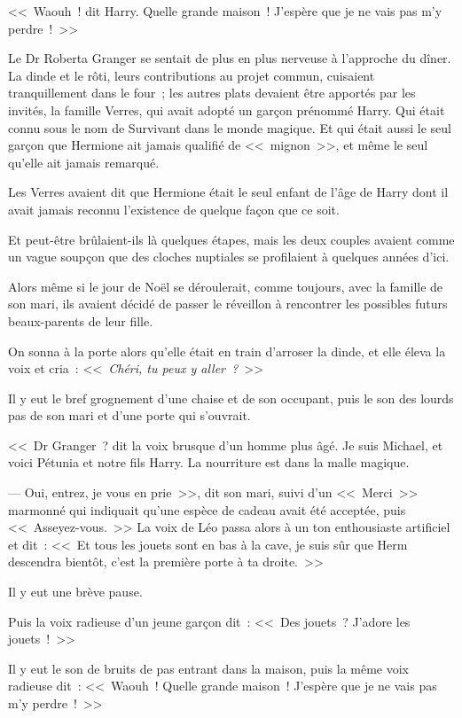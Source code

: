 <<~Waouh~! dit Harry. Quelle grande maison~! J'espère que je ne vais pas m'y perdre~!~>>

\later

Le Dr Roberta Granger se sentait de plus en plus nerveuse à l'approche du dîner. La dinde et le rôti, leurs contributions au projet commun, cuisaient tranquillement dans le four~; les autres plats devaient être apportés par les invités, la famille Verres, qui avait adopté un garçon prénommé Harry. Qui était connu sous le nom de Survivant dans le monde magique. Et qui était aussi le seul garçon que Hermione ait jamais qualifié de <<~mignon~>>, et même le seul qu'elle ait jamais remarqué.

Les Verres avaient dit que Hermione était le seul enfant de l'âge de Harry dont il avait jamais reconnu l'existence de quelque façon que ce soit.

Et peut-être brûlaient-ils là quelques étapes, mais les deux couples avaient comme un vague soupçon que des cloches nuptiales se profilaient à quelques années d'ici.

Alors même si le jour de Noël se déroulerait, comme toujours, avec la famille de son mari, ils avaient décidé de passer le réveillon à rencontrer les possibles futurs beaux-parents de leur fille.

On sonna à la porte alors qu'elle était en train d'arroser la dinde, et elle éleva la voix et cria~: <<~\emph{Chéri, tu peux y aller~?}~>>

Il y eut le bref grognement d'une chaise et de son occupant, puis le son des lourds pas de son mari et d'une porte qui s'ouvrait.

<<~Dr Granger~? dit la voix brusque d'un homme plus âgé. Je suis Michael, et voici Pétunia et notre fils Harry. La nourriture est dans la malle magique.

--- Oui, entrez, je vous en prie~>>, dit son mari, suivi d'un <<~Merci~>> marmonné qui indiquait qu'une espèce de cadeau avait été acceptée, puis <<~Asseyez-vous.~>> La voix de Léo passa alors à un ton enthousiaste artificiel et dit~: <<~Et tous les jouets sont en bas à la cave, je suis sûr que Herm descendra bientôt, c'est la première porte à ta droite.~>>

Il y eut une brève pause.

Puis la voix radieuse d'un jeune garçon dit~: <<~Des jouets~? J'adore les jouets~!~>>

Il y eut le son de bruits de pas entrant dans la maison, puis la même voix radieuse dit~: <<~Waouh~! Quelle grande maison~! J'espère que je ne vais pas m'y perdre~!~>>


